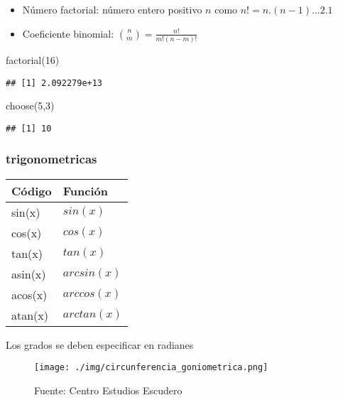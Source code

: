 \documentclass[
]{article}
\newenvironment{Shaded}{\begin{snugshade}}{\end{snugshade}}
\newcommand{\DecValTok}[1]{\textcolor[rgb]{0.00,0.00,0.81}{#1}}
\newcommand{\FunctionTok}[1]{\textcolor[rgb]{0.00,0.00,0.00}{#1}}
\newcommand{\NormalTok}[1]{#1}
\providecommand{\tightlist}{%
  \setlength{\itemsep}{0pt}\setlength{\parskip}{0pt}}
\begin{document}
\begin{itemize}
\tightlist
\item
  Número factorial: número entero positivo \(n\) como
  \(n! = n . (n-1) ... 2 . 1\)
\item
  Coeficiente binomial: \(\binom{n}{m} = \frac{n!}{m!(n-m)!}\)
\end{itemize}

\begin{Shaded}
\begin{Highlighting}[]
\FunctionTok{factorial}\NormalTok{(}\DecValTok{16}\NormalTok{)}
\end{Highlighting}
\end{Shaded}

\begin{verbatim}
## [1] 2.092279e+13
\end{verbatim}

\begin{Shaded}
\begin{Highlighting}[]
\FunctionTok{choose}\NormalTok{(}\DecValTok{5}\NormalTok{,}\DecValTok{3}\NormalTok{)}
\end{Highlighting}
\end{Shaded}

\begin{verbatim}
## [1] 10
\end{verbatim}

\hypertarget{trigonometricas}{%
\subsubsection{trigonometricas}\label{trigonometricas}}

\begin{longtable}[]{@{}ll@{}}
\toprule()
Código & Función \\
\midrule()
\endhead
sin(x) & \(sin(x)\) \\
cos(x) & \(cos(x)\) \\
tan(x) & \(tan(x)\) \\
asin(x) & \(arcsin(x)\) \\
acos(x) & \(arccos(x)\) \\
atan(x) & \(arctan(x)\) \\
\bottomrule()
\end{longtable}

Los grados se deben especificar en radianes

\begin{figure}
\centering
\texttt{[image: ./img/circunferencia\_goniometrica.png]}
\caption{Fuente: Centro Estudios Escudero}
\end{figure}
\end{document}
